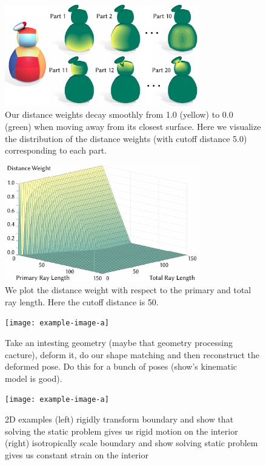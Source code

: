 \begin{figure}
  \centering
  \includegraphics[width=3.33in]{figures/distance_weight_puft.pdf}
  \caption{Our distance weights decay smoothly from 1.0 (yellow) to 0.0 (green) when moving away from its closest surface. Here we visualize the distribution of the distance weights (with cutoff distance 5.0) corresponding to each part.   
  }
  \label{fig:distance_weight_puft}
  \vspace{-5pt}
\end{figure} 
%
%
\begin{figure}
  \centering
  \includegraphics[width=3.33in]{figures/plot_distance_weight.pdf}
  \caption{We plot the distance weight with respect to the primary and total ray length. Here the cutoff distance is 50.
  }
  \label{fig:plot_distance_weight}
  \vspace{-5pt}
\end{figure} 

\begin{figure}
  \texttt{[image: example-image-a]}
  \caption{Take an intesting geometry (maybe that geometry processing cacture), deform it, do our shape matching and then reconstruct the deformed pose. Do this for a bunch of poses (show's kinematic model is good).}
  \label{fig:deform}
\end{figure}


\begin{figure}
  \texttt{[image: example-image-a]}
  \caption{2D examples (left) rigidly transform boundary and show that solving the static problem gives us rigid motion on the interior (right) isotropically scale boundary and show solving static problem gives us constant strain on the interior}
  \label{fig:patchtest}
\end{figure}

